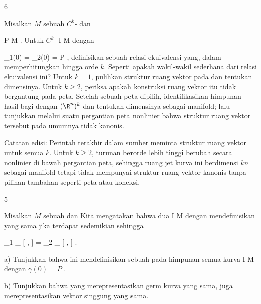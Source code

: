 {6}
{

Misalkan $M$ sebuah
$C^k$-
dan

\mavergleichskette
{\vergleichskette
{ P
}
{ \in }{ M
}
{  }{
}
{    }{
}
{   }{
}
}
{}{}{.}
Untuk
$C^k$-
 { I } { M
} {}
dengan

\mavergleichskette
{\vergleichskette
{ \gamma_1(0)
}
{ = }{ \gamma_2(0)
}
{ = }{ P
}
{    }{
}
{   }{
}
}
{}{}{}, definisikan sebuah relasi ekuivalensi yang, dalam
 {} {}
memperhitungkan
hingga orde $k$. Seperti apakah wakil-wakil sederhana dari relasi ekuivalensi ini? Untuk $k=1$, pulihkan struktur ruang vektor pada
dan tentukan dimensinya. Untuk $k\geq 2$, periksa apakah konstruksi ruang vektor itu tidak bergantung pada peta. Setelah sebuah peta dipilih, identifikasikan himpunan hasil bagi dengan $(\R^n)^k$ dan tentukan dimensinya sebagai manifold; lalu tunjukkan melalui suatu pergantian peta nonlinier bahwa struktur ruang vektor tersebut pada umumnya tidak kanonis.

Catatan edisi: Perintah terakhir dalam sumber meminta struktur ruang vektor untuk semua $k$. Untuk $k\geq2$, turunan berorde lebih tinggi berubah secara nonlinier di bawah pergantian peta, sehingga ruang jet kurva ini berdimensi $kn$ sebagai manifold tetapi tidak mempunyai struktur ruang vektor kanonis tanpa pilihan tambahan seperti peta atau koneksi.

}
{} {}

{5}
{

Misalkan $M$ sebuah
dan
 Kita mengatakan bahwa dua
 { I } { M
} {}
dengan
 mendefinisikan  {} yang sama jika terdapat
 sedemikian sehingga

\mavergleichskettedisp
{\vergleichskette
{ \gamma_1 \!\mid_{ [-\epsilon, \epsilon]}
}
{ =} { \gamma_2 \!\mid_{ [-\epsilon, \epsilon]}
}
{ } {
}
{ } {
}
{ } {
}
}
{}{}{.}

a) Tunjukkan bahwa ini mendefinisikan sebuah
pada himpunan semua kurva
\maabb {\gamma} { I } { M
} {}
dengan $\gamma(0)= P$
 {} {.}

b) Tunjukkan bahwa
yang merepresentasikan germ kurva yang sama, juga merepresentasikan vektor singgung yang sama.

}
{} {}

